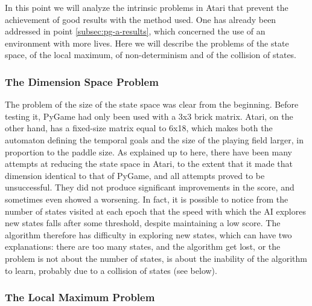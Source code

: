 In this point we will analyze the intrinsic problems in Atari that prevent the achievement of good results with the method used. One has already been addressed in point \ref{subsec:pg-a-results}, which concerned the use of an environment with more lives. Here we will describe the problems of the state space, of the local maximum, of non-determinism and of the collision of states.

\subsubsection{The Dimension Space Problem}

The problem of the size of the state space was clear from the beginning. Before testing it, PyGame had only been used with a 3x3 brick matrix. Atari, on the other hand, has a fixed-size matrix equal to 6x18, which makes both the automaton defining the temporal goals and the size of the playing field larger, in proportion to the paddle size. As explained up to here, there have been many attempts at reducing the state space in Atari, to the extent that it made that dimension identical to that of PyGame, and all attempts proved to be unsuccessful. They did not produce significant improvements in the score, and sometimes even showed a worsening. In fact, it is possible to notice from the number of states visited at each epoch that the speed with which the AI explores new states falls after some threshold, despite maintaining a low score. The algorithm therefore has difficulty in exploring new states, which can have two explanations: there are too many states, and the algorithm get lost, or the problem is not about the number of states, is about the inability of the algorithm to learn, probably due to a collision of states (see below).

\subsubsection{The Local Maximum Problem}

